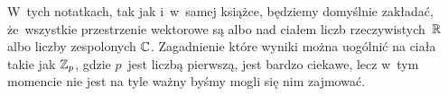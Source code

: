 \documentclass[a4paper,11pt]{article}
\begin{document}
\noindent
W~tych notatkach, tak jak i~w~samej książce, będziemy domyślnie
zakładać, że~wszystkie przestrzenie wektorowe są albo nad ciałem liczb
rzeczywistych~$\mathbb{R}$ albo liczby zespolonych $\mathbb{C}$. Zagadnienie które
wyniki można uogólnić na ciała takie jak $\mathbb{Z}_{ p }$, gdzie $p$~jest liczbą
pierwszą, jest bardzo ciekawe, lecz w~tym momencie nie jest na tyle ważny
byśmy mogli się nim zajmować.

\VerSpaceFour







\noindent
{}

\VerSpaceFour





\noindent
{}

\VerSpaceFour





\noindent
{}

\VerSpaceFour





\noindent
{}

\VerSpaceFour





\noindent
\Str{}

\VerSpaceFour





\noindent
\Str{}

\VerSpaceFour





\noindent
\Str{}

\VerSpaceFour





\noindent
\Str{}

\VerSpaceFour





\noindent
\Str{}

\VerSpaceFour





\noindent
\Str{}

\VerSpaceFour
\end{document}
